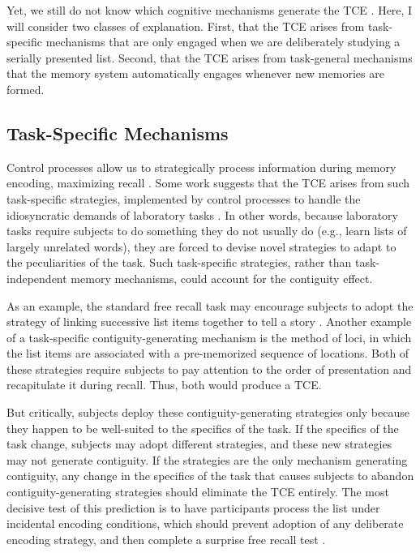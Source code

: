 \documentclass[man,natbib,floatsintext]{apa6} %
\begin{document}
Yet, we still do not know which cognitive mechanisms generate the TCE \citep{HealKaha17}. Here, I will consider two classes of explanation. First, that the TCE arises from task-specific mechanisms that are only engaged when we are deliberately studying a serially presented list. Second, that the TCE arises from task-general mechanisms that the memory system automatically engages whenever new memories are formed.
 
\subsection{Task-Specific Mechanisms}
Control processes \citep{LehmMalm13,AtkiShif68} allow us to strategically process information during memory encoding, maximizing recall \citep[e.g.,][]{Unsw16,DelaKnow05}. Some work suggests that the TCE arises from such task-specific strategies, implemented by control processes to handle the idiosyncratic demands of laboratory tasks \citep{Hint16}. In other words, because laboratory tasks require subjects to do something they do not usually do (e.g., learn lists of largely unrelated words), they are forced to devise novel strategies to adapt to the peculiarities of the task. Such task-specific strategies, rather than task-independent memory mechanisms, could account for the contiguity effect.

As an example, the standard free recall task may encourage subjects to adopt the strategy of linking successive list items together to tell a story \citep{DelaKnow05}. Another example of a task-specific contiguity-generating mechanism is the method of loci, in which the list items are associated with a pre-memorized sequence of locations. Both of these strategies require subjects to pay attention to the order of presentation and recapitulate it during recall. Thus, both would produce a TCE.

But critically, subjects deploy these contiguity-generating strategies only because they happen to be well-suited to the specifics of the task. If the specifics of the task change, subjects may adopt different strategies, and these new strategies may not generate contiguity.
If the strategies are the only mechanism generating contiguity, any change in the specifics of the task that causes subjects to abandon contiguity-generating strategies should eliminate the TCE entirely. The most decisive test of this prediction is to have participants process the list under incidental encoding conditions, which should prevent adoption of any deliberate encoding strategy, and then complete a surprise free recall test \citep{Hint16}.
\end{document}
